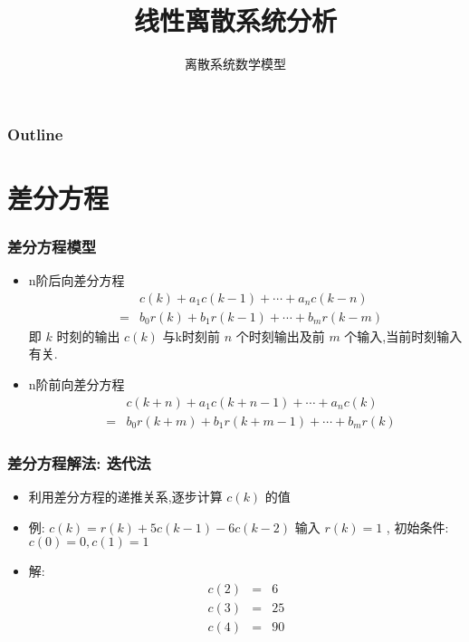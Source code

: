 \documentclass[table]{beamer}
\subtitle{离散系统数学模型}
\title{线性离散系统分析}
\author{}
\date{}
\begin{document}
\maketitle

\begin{frame}
\frametitle{Outline}
\setcounter{tocdepth}{3}
\tableofcontents
\end{frame}












\section{差分方程}
\label{sec-1}
\begin{frame}
\frametitle{差分方程模型}
\label{sec-1-1}

\begin{itemize}
\item <2->n阶后向差分方程
     \begin{eqnarray*}
      & &c(k)+a_1 c(k-1)+\cdots+a_n c(k-n) \\
      &=& b_0 r(k) +b_1 r(k-1) + \cdots + b_m r(k-m)
     \end{eqnarray*}
     即  $k$  时刻的输出  $c(k)$  与k时刻前  $n$  个时刻输出及前  $m$  个输入,当前时刻输入有关.
\item <3->n阶前向差分方程
     \begin{eqnarray*}
   & &  c(k+n)+a_1 c(k+n-1)+\cdots+a_n c(k) \\
   &=& b_0 r(k+m)+b_1 r(k+m-1)+\cdots+ b_m r(k)
     \end{eqnarray*}
\end{itemize}
\end{frame}
\begin{frame}
\frametitle{差分方程解法: 迭代法}
\label{sec-1-2}

\begin{itemize}
\item 利用差分方程的递推关系,逐步计算  $c(k)$  的值
\item <2->例:  $c(k)=r(k)+5 c(k-1) -6 c(k-2)$  输入  $r(k)=1$ , 初始条件:  $c(0)=0,c(1)=1$
\item <3->解:
     \begin{eqnarray*}
     c(2) & = & 6\\
     c(3) & =& 25 \\
     c(4) &=& 90
     \end{eqnarray*}
\end{itemize}
\end{frame}
\end{document}
